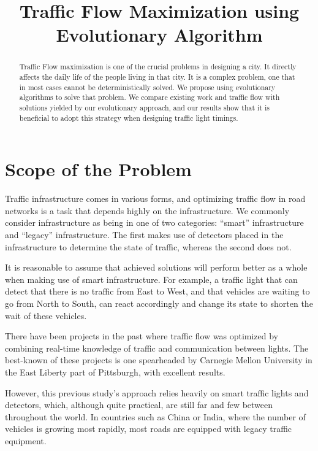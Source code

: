 \documentclass{article} %
\title{Traffic Flow Maximization using Evolutionary Algorithm}
\begin{document}
\maketitle

\begin{abstract}
Traffic Flow maximization is one of the crucial problems in designing a city. It directly affects the daily life of the people living in that city. It is a complex problem, one that in most cases cannot be deterministically solved. We propose using evolutionary algorithms to solve that problem. We compare existing work and traffic flow with solutions yielded by our evolutionary approach, and our results show that it is beneficial to adopt this strategy when designing traffic light timings.
\end{abstract}

\section{Scope of the Problem}

Traffic infrastructure comes in various forms, and optimizing traffic flow in road networks is a task that depends highly on the infrastructure. We commonly consider infrastructure as being in one of two categories:  ``smart'' infrastructure and ``legacy'' infrastructure. The first makes use of detectors placed in the infrastructure to determine the state of traffic, whereas the second does not.

It is reasonable to assume that achieved solutions will perform better as a whole when making use of smart infrastructure. For example, a traffic light that can detect that there is no traffic from East to West, and that vehicles are waiting to go from North to South, can react accordingly and change its state to shorten the wait of these vehicles.

There have been projects in the past where traffic flow was optimized by combining real-time knowledge of traffic and communication between lights. The best-known of these projects is one spearheaded by Carnegie Mellon University in the East Liberty part of Pittsburgh, with excellent results.

However, this previous study's approach relies heavily on smart traffic lights and detectors, which, although quite practical, are still far and few between throughout the world. In countries such as China or India, where the number of vehicles is growing most rapidly, most roads are equipped with legacy traffic equipment.
\end{document}

